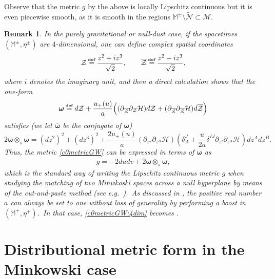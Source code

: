 \documentclass[11pt]{article}
\numberwithin{equation}{section}
\newtheorem{remark}[theorem]{Remark}
\def\Mkp{\mathbb{M}^+}
\def\Mkpm{\mathbb{M}^{\pm}}
\def\flatp{\eta^+}
\def\flatpm{\eta^{\pm}}
\def\defi{{\stackrel{\mbox{\tiny {\textbf{def}}}}{\,\, = \,\, }}}
\newcommand{\nn}{\nonumber}
\newcommand\N{\mathcal N}
\newcommand\M{\mathcal M}
\def\defi{{\stackrel{\mbox{\tiny \textup{\textbf{def}}}}{\,\, = \,\, }}}
\newcommand{\ov}{\overline}
\newcommand{\cp}{\partial}
\newcommand{\bs}{\boldsymbol}
\newcommand{\lp}{\left(}
\newcommand{\rp}{\right)}
\newcommand{\nullhyp}{\widetilde{\N}}
\begin{document}
Observe that the metric $g$ by the above is locally Lipschitz continuous but it is even piecewise smooth, as it is smooth in the regions $\Mkpm\setminus\nullhyp\subset\M$. 
\begin{remark}\label{rem:specialcase}
	In the purely gravitational or null-dust case, if the spacetimes 
	$(\Mkpm,\flatpm)$ are $4$-dimensional, one can define complex spatial  coordinates 
	\begin{equation}
		\mathcal{Z}\defi \frac{z^2+iz^3}{\sqrt{2}},\qquad \ov{\mathcal{Z}}\defi \frac{z^2-iz^3}{\sqrt{2}},
	\end{equation}
	where $i$ denotes the imaginary unit, and then a direct calculation shows that the one-form
	\begin{equation}
		\label{def:omega:form}\bs{\omega}\defi d\mathcal{Z}+\frac{u_+(u)}{a}\Big( (\cp_{\ov{\mathcal{Z}}}\cp_{\mathcal{Z}}\mathcal{H}) d\mathcal{Z}+(\cp_{\ov{\mathcal{Z}}}\cp_{\ov{\mathcal{Z}}}\mathcal{H}) d\ov{\mathcal{Z}}\Big)
	\end{equation}
	satisfies (we let $\ov{\bs{\omega}}$ be the conjugate of $\bs{\omega}$)
	\begin{equation}
		\nn 2\bs{\omega}\otimes_s\ov{\bs{\omega}}=(dz^2)^2+(dz^3)^2+\frac{2u_+(u)}{a}(\cp_{z^J}\cp_{z^B}\mathcal{H}) \lp \delta_A^J+\frac{u}{2a}\delta^{IJ}\cp_{z^I}\cp_{z^A}\mathcal{H}\rp dz^Adz^B.
	\end{equation}
	Thus, the metric \eqref{c0metricGW} can be expressed in terms of $\bs{\omega}$ as
	\begin{align}
		\label{c0metricGW:4dim} g=-2dudv +2\bs{\omega}\otimes_s\ov{\bs{\omega}}, 
	\end{align}
	which is the standard way of writing the Lipschitz continuous metric $g$ when studying the matching of two 
	Minwkoski spaces across a null hyperplane by means of the cut-and-paste method (see e.g.\ \textup{\cite{penrose1968twistor,podolsky2017penrose}}).\ 
	As discussed in \textup{\cite{manzano2021null}}, the positive real number $a$ can always be set to one without loss of generality 
	by performing a boost in $(\Mkp,\flatp)$.\ In that case,  
	\eqref{c0metricGW:4dim} becomes \textup{\cite[Eq.\ (5)]{podolsky2017penrose}}.\   
	\end{remark}


\section{Distributional metric form in the Minkowski case}\label{sec:dist:metric}
\end{document}
